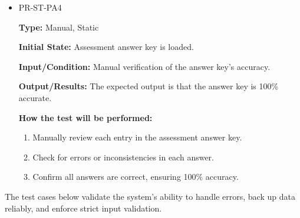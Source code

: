 \documentclass[12pt, titlepage]{article}
\begin{document}
\begin{itemize}
\begin{mdframed}[linewidth=0.5mm]
  \end{mdframed}
  \item PR-ST-PA4
  \begin{mdframed}[linewidth=0.5mm]
      \textbf{Type:} Manual, Static \par
      \textbf{Initial State:} Assessment answer key is loaded. \par
      \textbf{Input/Condition:} Manual verification of the answer key’s accuracy. \par
      \textbf{Output/Results:} The expected output is that the answer key is 100\% accurate. \par
      \textbf{How the test will be performed:}
      \begin{enumerate}[noitemsep]
        \item Manually review each entry in the assessment answer key.
        \item Check for errors or inconsistencies in each answer.
        \item Confirm all answers are correct, ensuring 100\% accuracy.
      \end{enumerate}
  \end{mdframed}
\end{itemize}

\hspace{2em}The test cases below validate the system’s ability to handle errors, 
back up data reliably, and enforce strict input validation.
\end{document}
